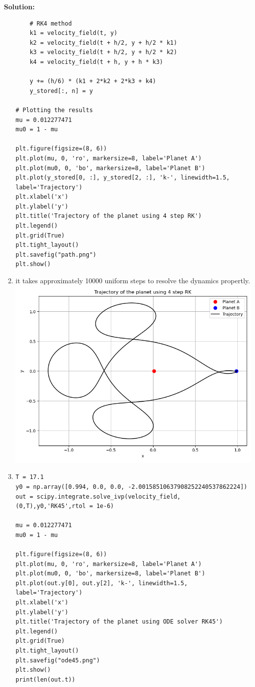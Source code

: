 \documentclass[a4paper,12pt]{scrartcl} %
\newenvironment{solution}
  {\par\color{answercolor}\textbf{Solution:}\ }
  {\par}
\theoremstyle{darktheorem}
\begin{document}
\begin{solution}
\begin{enumerate}
\begin{lstlisting}
    # RK4 method
    k1 = velocity_field(t, y)
    k2 = velocity_field(t + h/2, y + h/2 * k1)
    k3 = velocity_field(t + h/2, y + h/2 * k2)
    k4 = velocity_field(t + h, y + h * k3)

    y += (h/6) * (k1 + 2*k2 + 2*k3 + k4)
    y_stored[:, n] = y

# Plotting the results
mu = 0.012277471
mu0 = 1 - mu

plt.figure(figsize=(8, 6))
plt.plot(mu, 0, 'ro', markersize=8, label='Planet A')
plt.plot(mu0, 0, 'bo', markersize=8, label='Planet B')
plt.plot(y_stored[0, :], y_stored[2, :], 'k-', linewidth=1.5, label='Trajectory')
plt.xlabel('x')
plt.ylabel('y')
plt.title('Trajectory of the planet using 4 step RK')
plt.legend()
plt.grid(True)
plt.tight_layout()
plt.savefig("path.png")
plt.show()
            \end{lstlisting}
        \item it takes approximately 10000 uniform steps to resolve the dynamics propertly.\\
            \includegraphics[width = \textwidth]{path.png}
        \item 
            \begin{lstlisting}
T = 17.1
y0 = np.array([0.994, 0.0, 0.0, -2.00158510637908252240537862224])
out = scipy.integrate.solve_ivp(velocity_field, (0,T),y0,'RK45',rtol = 1e-6)

mu = 0.012277471
mu0 = 1 - mu

plt.figure(figsize=(8, 6))
plt.plot(mu, 0, 'ro', markersize=8, label='Planet A')
plt.plot(mu0, 0, 'bo', markersize=8, label='Planet B')
plt.plot(out.y[0], out.y[2], 'k-', linewidth=1.5, label='Trajectory')
plt.xlabel('x')
plt.ylabel('y')
plt.title('Trajectory of the planet using ODE solver RK45')
plt.legend()
plt.grid(True)
plt.tight_layout()
plt.savefig("ode45.png")
plt.show()
print(len(out.t))


\end{lstlisting}
\end{enumerate}
\end{solution}
\end{document}
